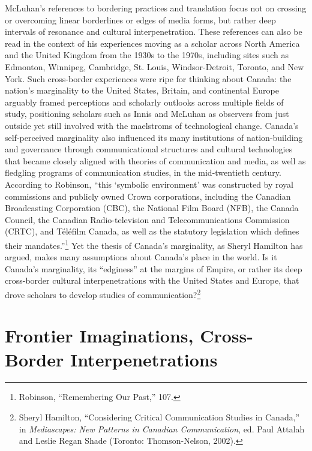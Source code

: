 \documentclass{tufte-handout}
\begin{document}
McLuhan's references to bordering practices and translation focus not on
crossing or overcoming linear borderlines or edges of media forms, but
rather deep intervals of resonance and cultural interpenetration. These
references can also be read in the context of his experiences moving as
a scholar across North America and the United Kingdom from the 1930s to
the 1970s, including sites such as Edmonton, Winnipeg, Cambridge, St.
Louis, Windsor-Detroit, Toronto, and New York. Such cross-border
experiences were ripe for thinking about Canada: the nation's
marginality to the United States, Britain, and continental Europe
arguably framed perceptions and scholarly outlooks across multiple
fields of study, positioning scholars such as Innis and McLuhan as
observers from just outside yet still involved with the maelstroms of
technological change. Canada's self-perceived marginality also
influenced its many institutions of nation-building and governance
through communicational structures and cultural technologies that became
closely aligned with theories of communication and media, as well as
fledgling programs of communication studies, in the mid-twentieth
century. According to Robinson, ``this `symbolic environment' was
constructed by royal commissions and publicly owned Crown corporations,
including the Canadian Broadcasting Corporation (CBC), the National Film
Board (NFB), the Canada Council, the Canadian Radio-television and
Telecommunications Commission (CRTC), and Téléfilm Canada, as well as
the statutory legislation which defines their mandates.''\footnote{Robinson,
  ``Remembering Our Past,'' 107.} Yet the thesis of Canada's
marginality, as Sheryl Hamilton has argued, makes many assumptions about
Canada's place in the world. Is it Canada's marginality, its
``edginess'' at the margins of Empire, or rather its deep cross-border
cultural interpenetrations with the United States and Europe, that drove
scholars to develop studies of communication?\footnote{Sheryl Hamilton,
  ``Considering Critical Communication Studies in Canada,'' in
  \emph{Mediascapes: New Patterns in Canadian Communication}, ed. Paul
  Attalah and Leslie Regan Shade (Toronto: Thomson-Nelson, 2002).}

\hypertarget{frontier-imaginations-cross-border-interpenetrations}{%
\section{Frontier Imaginations, Cross-Border
Interpenetrations}\label{frontier-imaginations-cross-border-interpenetrations}}
\end{document}
